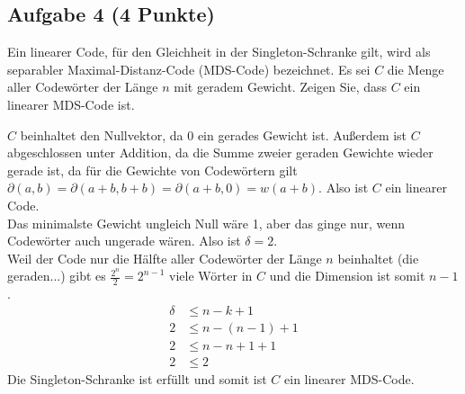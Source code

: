 \documentclass{article} %
\begin{document}
\subsection*{Aufgabe 4 (4 Punkte)}
Ein linearer Code, für den Gleichheit in der Singleton-Schranke gilt, wird als separabler
Maximal-Distanz-Code (MDS-Code) bezeichnet.
Es sei \( C \) die Menge aller Codewörter der Länge \( n \) mit geradem Gewicht. Zeigen Sie, dass \( C \)
ein linearer MDS-Code ist.
\begin{mybox}
$C$ beinhaltet den Nullvektor, da 0 ein gerades Gewicht ist. Außerdem ist $C$ abgeschlossen unter Addition, da die Summe zweier geraden Gewichte wieder gerade ist, da für die Gewichte von Codewörtern gilt $\partial(a, b) = \partial(a + b, b + b) = \partial(a + b, 0) = w(a + b)$. Also ist $C$ ein linearer Code. \\ 
Das minimalste Gewicht ungleich Null wäre 1, aber das ginge nur, wenn Codewörter auch ungerade wären. Also ist $\delta = 2$. \\ 
Weil der Code nur die Hälfte aller Codewörter der Länge $n$ beinhaltet (die geraden...) gibt es $\frac{2^n}{2} = 2^{n-1}$ viele Wörter in $C$ und die Dimension ist somit $n-1$. 
\begin{align*}
    \delta &  \leq n-k+1\\
     2 &  \leq n- (n-1) +1 \\
     2 &  \leq n- n + 1 +1  \\
     2 &  \leq 2
\end{align*}
Die Singleton-Schranke ist erfüllt und somit ist $C$ ein linearer MDS-Code. 
\end{mybox}
\end{document}
